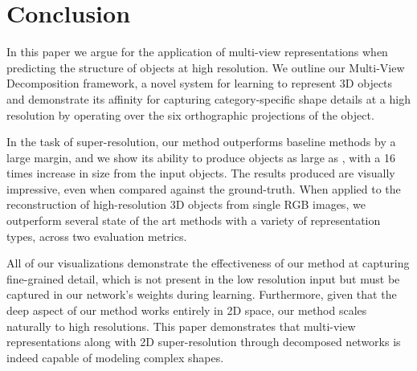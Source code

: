 \documentclass{article}
\begin{document}
\section{Conclusion}

In this paper we argue for the application of multi-view representations when predicting the structure of objects at high resolution. We outline our Multi-View Decomposition framework, a novel system for learning to represent 3D objects and demonstrate its affinity for capturing category-specific shape details at a high resolution by operating over the six orthographic projections of the object. 

In the task of super-resolution, our method outperforms baseline methods by a large margin, and we show its ability to produce objects as large as , with a 16 times increase in size from the input objects. The results produced are visually impressive, even when compared against the ground-truth. When applied to the reconstruction of high-resolution 3D objects from single RGB images, we outperform several state of the art methods with a variety of representation types, across two evaluation metrics. 

All of our visualizations demonstrate the effectiveness of our method at capturing fine-grained detail, which is not present in the low resolution input but must be captured in our network's weights during learning. Furthermore, given that the deep aspect of our method works entirely in 2D space, our method scales naturally to high resolutions. This paper demonstrates that multi-view representations along with 2D super-resolution through decomposed networks is indeed capable of modeling complex shapes. 





\end{document}
